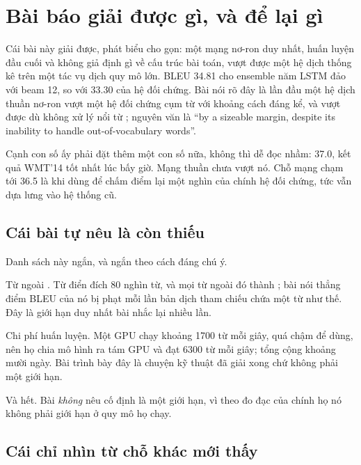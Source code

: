 \section{Bài báo giải được gì, và để lại gì}
\label{sec:ch05-con-lai-gi}

%
Cái bài này giải được, phát biểu cho gọn: một mạng nơ-ron duy nhất, huấn luyện
đầu cuối và không giả định gì về cấu trúc bài toán, vượt được một hệ dịch thống
kê trên một tác vụ dịch quy mô lớn. BLEU 34.81 cho ensemble năm LSTM đảo với
beam 12, so với 33.30 của hệ đối chứng. Bài nói rõ đây là lần đầu một hệ dịch
thuần nơ-ron vượt một hệ đối chứng cụm từ với khoảng cách đáng kể, và vượt được
dù không xử lý nổi từ ; nguyên văn là
\enquote{by a sizeable
margin, despite its inability to handle out-of-vocabulary words}.

Cạnh con số ấy phải đặt thêm một con số nữa, không thì dễ đọc nhầm: 37.0, kết
quả WMT'14 tốt nhất lúc bấy giờ. Mạng thuần chưa vượt nó. Chỗ mạng chạm tới 36.5
là khi dùng để chấm điểm lại một nghìn  của chính
hệ đối chứng, tức
vẫn dựa lưng vào hệ thống cũ.

\subsection*{Cái bài tự nêu là còn thiếu}

%
Danh sách này ngắn, và ngắn theo cách đáng chú ý.

Từ ngoài . Từ điển đích 80 nghìn từ, và mọi từ ngoài đó
thành ; bài nói thẳng điểm BLEU của nó bị phạt mỗi lần bản dịch tham
chiếu chứa một từ như thế. Đây là giới hạn duy nhất bài nhắc lại nhiều lần.

Chi phí huấn luyện. Một GPU chạy khoảng 1700 từ mỗi giây, quá chậm để dùng, nên
họ chia mô hình ra tám GPU và đạt 6300 từ mỗi giây; tổng cộng khoảng mười ngày.
Bài trình bày đây là chuyện kỹ thuật đã giải xong chứ không phải một giới hạn.

Và hết. Bài \emph{không} nêu  cố định là
một giới hạn, vì theo đo đạc của chính họ nó không phải giới hạn ở quy mô họ
chạy.

\subsection*{Cái chỉ nhìn từ chỗ khác mới thấy}

